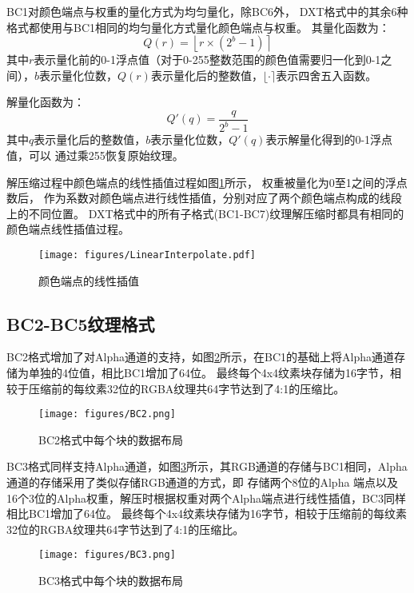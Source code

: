 BC1对颜色端点与权重的量化方式为均匀量化，除BC6外，
DXT格式中的其余6种格式都使用与BC1相同的均匀量化方式量化颜色端点与权重。
其量化函数为：
\begin{equation}\label{eqn-6}
    Q(r)=\left \lfloor r \times (2^{b}-1) \right \rceil
\end{equation}
其中$r$表示量化前的0-1浮点值（对于0-255整数范围的颜色值需要归一化到0-1之间），$b$表示量化位数，$Q(r)$表示量化后的整数值，$\lfloor \cdot \rceil$表示四舍五入函数。

解量化函数为：
\begin{equation}\label{eqn-6}
    Q'(q)=\frac{q}{2^{b}-1}
\end{equation}
其中$q$表示量化后的整数值，$b$表示量化位数，$Q'(q)$表示解量化得到的0-1浮点值，可以
通过乘255恢复原始纹理。

解压缩过程中颜色端点的线性插值过程如图\ref{fig:LinearInterpolate}所示，
权重被量化为0至1之间的浮点数后，
作为系数对颜色端点进行线性插值，分别对应了两个颜色端点构成的线段上的不同位置。
DXT格式中的所有子格式(BC1-BC7)纹理解压缩时都具有相同的颜色端点线性插值过程。

\begin{figure}[htbp]
    \centering
    \texttt{[image: figures/LinearInterpolate.pdf]}
    \caption{颜色端点的线性插值\cite{ASTC}}
    \label{fig:LinearInterpolate}
\end{figure}

\subsection{BC2-BC5纹理格式}
BC2格式增加了对Alpha通道的支持，如图\ref{fig:BC2}所示，在BC1的基础上将Alpha通道存储为单独的4位值，相比BC1增加了64位。
最终每个4x4纹素块存储为16字节，相较于压缩前的每纹素32位的RGBA纹理共64字节达到了4:1的压缩比。

\begin{figure}[htbp]
    \centering
    \texttt{[image: figures/BC2.png]}
    \caption{BC2格式中每个块的数据布局\cite{BC1-5}}
    \label{fig:BC2}
\end{figure}    

BC3格式同样支持Alpha通道，如图\ref{fig:BC3}所示，其RGB通道的存储与BC1相同，Alpha通道的存储采用了类似存储RGB通道的方式，即
存储两个8位的Alpha 端点以及16个3位的Alpha权重，解压时根据权重对两个Alpha端点进行线性插值，BC3同样相比BC1增加了64位。
最终每个4x4纹素块存储为16字节，相较于压缩前的每纹素32位的RGBA纹理共64字节达到了4:1的压缩比。

\begin{figure}[htbp]
    \centering
    \texttt{[image: figures/BC3.png]}
    \caption{BC3格式中每个块的数据布局\cite{BC1-5}}
    \label{fig:BC3}
\end{figure}

